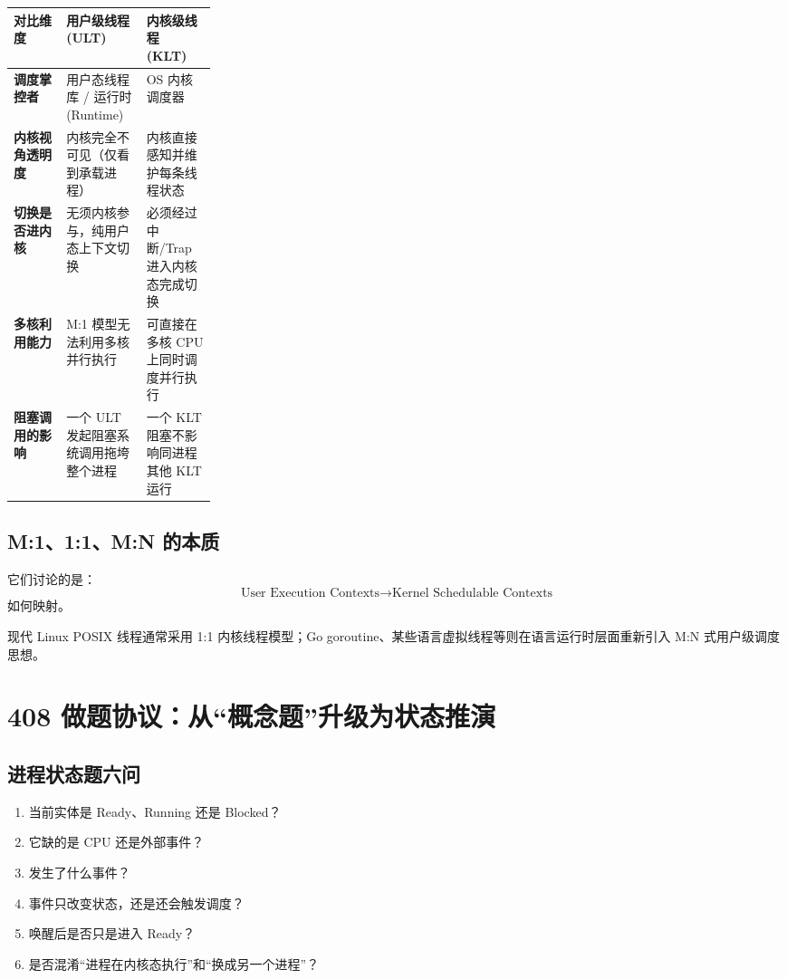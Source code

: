 \documentclass[11pt,a4paper]{ctexart}
\begin{document}
\begingroup
\small
\renewcommand{\arraystretch}{1.25}
\setlength{\tabcolsep}{6pt}
\begin{tabularx}{\linewidth}{>{\bfseries}p{0.26\linewidth} X X}
\toprule
对比维度 & 用户级线程 (ULT) & 内核级线程 (KLT)\\
\midrule
调度掌控者 & 用户态线程库 / 运行时 (Runtime) & OS 内核调度器\\
内核视角透明度 & 内核完全不可见（仅看到承载进程） & 内核直接感知并维护每条线程状态\\
切换是否进内核 & 无须内核参与，纯用户态上下文切换 & 必须经过中断/Trap 进入内核态完成切换\\
多核利用能力 & M:1 模型无法利用多核并行执行 & 可直接在多核 CPU 上同时调度并行执行\\
阻塞调用的影响 & 一个 ULT 发起阻塞系统调用拖垮整个进程 & 一个 KLT 阻塞不影响同进程其他 KLT 运行\\
\bottomrule
\end{tabularx}
\endgroup

\subsection{M:1、1:1、M:N 的本质}

它们讨论的是：
\[
\boxed{\text{User Execution Contexts}\rightarrow\text{Kernel Schedulable Contexts}}
\]
如何映射。

现代 Linux POSIX 线程通常采用 1:1 内核线程模型；Go goroutine、某些语言虚拟线程等则在语言运行时层面重新引入 M:N 式用户级调度思想。

\section{408 做题协议：从“概念题”升级为状态推演}

\subsection{进程状态题六问}
\begin{enumerate}
\item 当前实体是 Ready、Running 还是 Blocked？
\item 它缺的是 CPU 还是外部事件？
\item 发生了什么事件？
\item 事件只改变状态，还是还会触发调度？
\item 唤醒后是否只是进入 Ready？
\item 是否混淆“进程在内核态执行”和“换成另一个进程”？
\end{enumerate}
\end{document}
